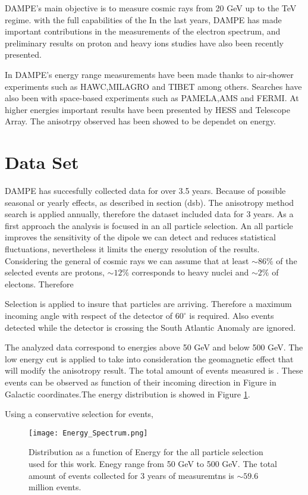\documentclass{PoS}
\begin{document}
DAMPE's main objective is to measure cosmic rays from 20 GeV up to the TeV regime. with the full capabilities of the  In the last years, DAMPE has made important contributions in the measurements of the electron spectrum, and preliminary results on  proton and heavy ions studies have also been recently presented.

In DAMPE's energy range measurements have been made thanks to air-shower experiments such as HAWC,MILAGRO and TIBET among others. Searches have also been with space-based experiments such as PAMELA,AMS and FERMI. At higher energies important results have been presented by HESS and Telescope Array. The anisotrpy observed has been showed to be dependet on energy.


\section{Data Set}
DAMPE has succesfully collected data for over  3.5 years.   Because of possible seasonal or yearly effects, as described in section (dsb). The anisotropy method search is applied annually, therefore the dataset included data  for 3 years. As a first approach the analysis is focused in an all particle selection. An all particle improves the sensitivity of the dipole we can detect and reduces statistical fluctuations, nevertheless it limits the energy resolution of the results. Considering the general of cosmic rays we can assume that at least $\sim 86 \%$ of the selected events are protons, $ \sim 12 \%$ corresponds to heavy nuclei and  $ \sim 2\%$ of electons. Therefore

Selection is applied to insure that particles are arriving. Therefore a maximum incoming angle with respect of the detector of $60 ^{\circ}$ is required. Also  events detected while the detector is crossing the South Atlantic Anomaly are ignored.

The analyzed data correspond to energies above 50 GeV and below 500 GeV. The low energy cut is applied to take into consideration the geomagnetic effect that will modify the  anisotropy  result.
The total amount of events measured is . These events can be observed as function of their incoming direction in Figure in Galactic coordinates.The energy distribution is showed in Figure \ref{allCR_ene}.


Using a conservative selection for events,

\begin{figure}[!ht]\label{allCR_ene}

\texttt{[image: Energy\_Spectrum.png]}
\caption{Distribution as a function of Energy for the all particle selection used for this work. Enegy range from 50 GeV to 500 GeV. The total amount of events collected for 3 years of measuremtns is $\sim 59.6$ million events.}

\end{figure}
\end{document}
